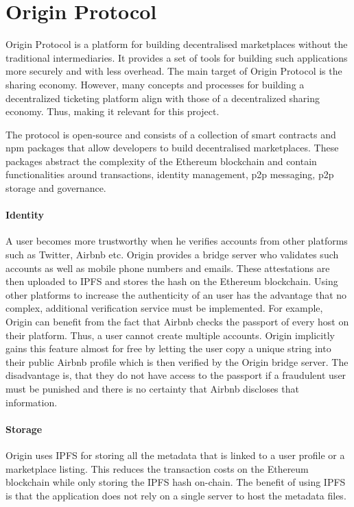
\section{Origin Protocol}
Origin Protocol is a platform for building decentralised marketplaces without the traditional intermediaries. It provides a set of tools for building such applications more securely and with less overhead. The main target of Origin Protocol is the sharing economy. However, many concepts and processes for building a decentralized ticketing platform align with those of a decentralized sharing economy. Thus, making it relevant for this project.

The protocol is open-source and consists of a collection of smart contracts and npm packages that allow developers to build decentralised marketplaces. These packages abstract the complexity of the Ethereum blockchain and contain functionalities around transactions, identity management, p2p messaging, p2p storage and governance.

\paragraph{Identity}
A user becomes more trustworthy when he verifies accounts from other platforms such as Twitter, Airbnb etc. Origin provides a bridge server who validates such accounts as well as mobile phone numbers and emails. These attestations are then uploaded to IPFS and stores the hash on the Ethereum blockchain. 
Using other platforms to increase the authenticity of an user has the advantage that no complex, additional verification service must be implemented. 
For example, Origin can benefit from the fact that Airbnb checks the passport of every host on their platform. Thus, a user cannot create multiple accounts. Origin implicitly gains this feature almost for free by letting the user copy a unique string into their public Airbnb profile which is then verified by the Origin bridge server.
The disadvantage is, that they do not have access to the passport if a fraudulent user must be punished and there is no certainty that Airbnb discloses that information.

\paragraph{Storage}
Origin uses IPFS for storing all the metadata that is linked to a user profile or a marketplace listing. This reduces the transaction costs on the Ethereum blockchain while only storing the IPFS hash on-chain. The benefit of using IPFS is that the application does not rely on a single server to host the metadata files. 

